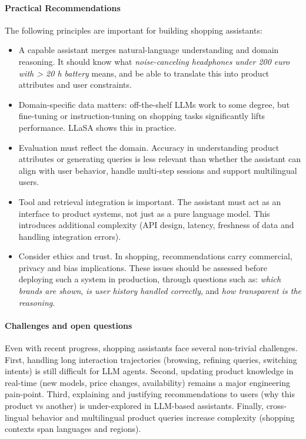 \paragraph{Practical Recommendations}
The following principles are important for building shopping assistants:
\begin{itemize}
  \item A capable assistant merges natural-language understanding and domain reasoning. It should know what {\em noise-canceling headphones under 200 euro with > 20 h battery} means, and be able to translate this into product attributes and user constraints.
  \item Domain-specific data matters: off-the-shelf LLMs work to some degree, but fine-tuning or instruction-tuning on shopping tasks significantly lifts performance. LLaSA \citep{zhang2024llasa} shows this in practice.
  \item Evaluation must reflect the domain. Accuracy in understanding product attributes or generating queries is less relevant than whether the assistant can align with user behavior, handle multi-step sessions and support multilingual users.
  \item Tool and retrieval integration is important. The assistant must act as an interface to product systems, not just as a pure language model. This introduces additional complexity (API design, latency, freshness of data and handling integration errors).
  \item Consider ethics and trust. In shopping, recommendations carry commercial, privacy and bias implications. These issues should be assessed before deploying such a system in production, through questions such as: {\em which brands are shown}, {\em is user history handled correctly}, and {\em how transparent is the reasoning}.
\end{itemize}

\paragraph{Challenges and open questions}
Even with recent progress, shopping assistants face several non-trivial challenges. First, handling long interaction trajectories (browsing, refining queries, switching intents) is still difficult for LLM agents. Second, updating product knowledge in real-time (new models, price changes, availability) remains a major engineering pain-point. Third, explaining and justifying recommendations to users (why this product vs another) is under-explored in LLM-based assistants. Finally, cross-lingual behavior and multilingual product queries increase complexity (shopping contexts span languages and regions).


